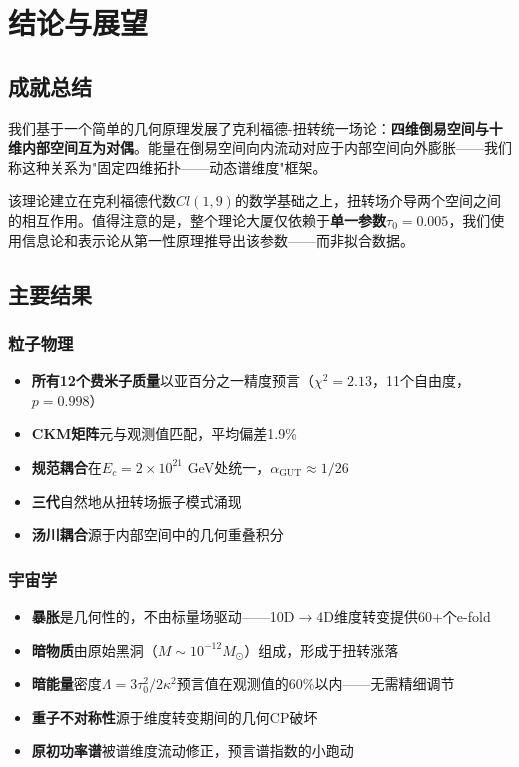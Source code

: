 \section{结论与展望}
\label{sec:conclusions}

\subsection{成就总结}

我们基于一个简单的几何原理发展了克利福德-扭转统一场论：\textbf{四维倒易空间与十维内部空间互为对偶}。能量在倒易空间向内流动对应于内部空间向外膨胀——我们称这种关系为"固定四维拓扑——动态谱维度"框架。

该理论建立在克利福德代数$Cl(1,9)$的数学基础之上，扭转场介导两个空间之间的相互作用。值得注意的是，整个理论大厦仅依赖于\textbf{单一参数}$\tau_0 = 0.005$，我们使用信息论和表示论从第一性原理推导出该参数——而非拟合数据。

\subsection{主要结果}

\subsubsection{粒子物理}

\begin{itemize}
    \item \textbf{所有12个费米子质量}以亚百分之一精度预言（$\chi^2 = 2.13$，11个自由度，$p = 0.998$）
    \item \textbf{CKM矩阵}元与观测值匹配，平均偏差1.9\%
    \item \textbf{规范耦合}在$E_c = 2\times 10^{21}$ GeV处统一，$\alpha_{\text{GUT}} \approx 1/26$
    \item \textbf{三代}自然地从扭转场振子模式涌现
    \item \textbf{汤川耦合}源于内部空间中的几何重叠积分
\end{itemize}

\subsubsection{宇宙学}

\begin{itemize}
    \item \textbf{暴胀}是几何性的，不由标量场驱动——10D$\to$4D维度转变提供60+个e-fold
    \item \textbf{暗物质}由原始黑洞（$M \sim 10^{-12} M_\odot$）组成，形成于扭转涨落
    \item \textbf{暗能量}密度$\Lambda = 3\tau_0^2/2\kappa^2$预言值在观测值的60\%以内——无需精细调节
    \item \textbf{重子不对称性}源于维度转变期间的几何CP破坏
    \item \textbf{原初功率谱}被谱维度流动修正，预言谱指数的小跑动
\end{itemize}

